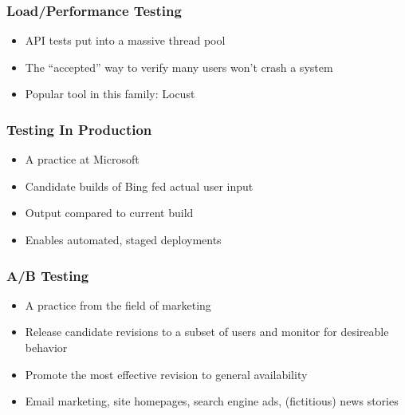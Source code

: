 \begin{frame}
  \frametitle{Load/Performance Testing}
  \begin{itemize}
    \item API tests put into a massive thread pool
    \item The ``accepted'' way to verify many users won't crash a system
    \item Popular tool in this family: Locust \citep{heymanlocust}
  \end{itemize}
\end{frame}

\begin{frame}
  \frametitle{Testing In Production}
  \begin{itemize}
    \item A practice at Microsoft \citep{AndrewsHeal}
    \item Candidate builds of Bing fed actual user input
    \item Output compared to current build
    \item Enables automated, staged deployments
  \end{itemize}
\end{frame}

\begin{frame}
  \frametitle{A/B Testing}
  \begin{itemize}
    \item A practice from the field of marketing
    \item Release candidate revisions to a subset of users and monitor for desireable behavior
    \item Promote the most effective revision to general availability
    \item Email marketing, site homepages, search engine ads, (fictitious) news stories
  \end{itemize}
  \citep{HBR2017ABTest}
\end{frame}

